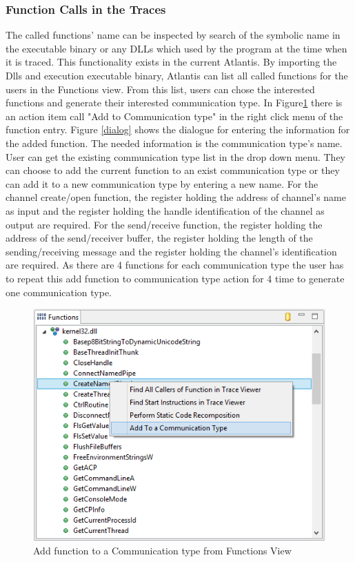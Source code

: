 \documentclass[paper=a4, fontsize=11pt]{scrartcl}
\numberwithin{equation}{section}		%
\numberwithin{figure}{section}			%
\numberwithin{table}{section}				%
\begin{document}
\subsubsection{Function Calls in the Traces}
The called functions' name can be inspected  by  search of the symbolic name in the executable binary or any DLLs which used by the program at the time when it is traced. This functionality exists in the current Atlantis. By importing the Dlls and execution  executable binary, Atlantis can list all called functions for the users in the Functions view. From this list, users can chose the interested functions and generate their interested communication type. In Figure\ref{functionsview} there is  an action item call "Add to Communication type" in the right click menu of the function entry. Figure \ref{dialog} shows the dialogue for entering the information for the added function. The needed information is the communication type's name. User can get the existing communication type list in the drop down menu. They can choose to add the current function to an exist communication type or they can add it to a new communication type by entering a new name. For the channel create/open function, the register holding the address of channel's name as input and the register holding the handle identification of the channel as output are required. For the send/receive function, the register holding the address of the send/receiver buffer, the register holding the length of the sending/receiving message and the register holding the channel's identification are required. As there are 4 functions for each communication type the user has to repeat this add function to communication type action for 4 time to generate one communication type.

\begin{figure}[h]
\includegraphics{functionsview}
 \caption{Add function to a Communication type from Functions View}
\label{functionsview}
\end{figure}
\end{document}
